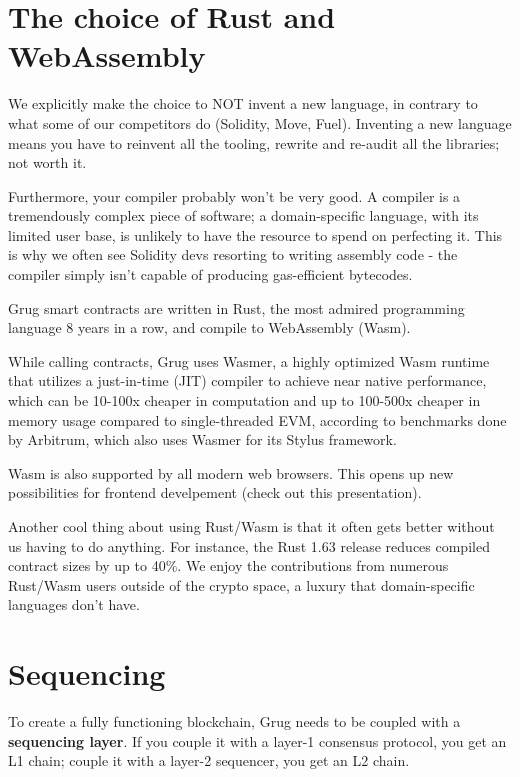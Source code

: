 \documentclass{article}
\begin{document}
\section{The choice of Rust and WebAssembly}

We explicitly make the choice to NOT invent a new language, in contrary to what some of our competitors do (Solidity, Move, Fuel). Inventing a new language means you have to reinvent all the tooling, rewrite and re-audit all the libraries; not worth it.

Furthermore, your compiler probably won't be very good. A compiler is a tremendously complex piece of software; a domain-specific language, with its limited user base, is unlikely to have the resource to spend on perfecting it. This is why we often see Solidity devs resorting to writing assembly code - the compiler simply isn't capable of producing gas-efficient bytecodes.

Grug smart contracts are written in Rust, the most admired programming language 8 years in a row,\supercite{mostadmiredlanguage2023} and compile to WebAssembly (Wasm).

While calling contracts, Grug uses Wasmer,\supercite{wasmer} a highly optimized Wasm runtime that utilizes a just-in-time (JIT) compiler to achieve near native performance,\supercite{wasmperformance} which can be 10-100x cheaper in computation and up to 100-500x cheaper in memory usage compared to single-threaded EVM, according to benchmarks\supercite{stylusgascosts} done by Arbitrum, which also uses Wasmer for its Stylus\supercite{stylus} framework.

Wasm is also supported by all modern web browsers. This opens up new possibilities for frontend develpement (check out this presentation\supercite{wasmcrossplatform}).

Another cool thing about using Rust/Wasm is that it often gets better without us having to do anything. For instance, the Rust 1.63 release reduces compiled contract sizes by up to 40\%.\supercite{wasmsizereduction} We enjoy the contributions from numerous Rust/Wasm users outside of the crypto space, a luxury that domain-specific languages don't have.

\section{Sequencing}

To create a fully functioning blockchain, Grug needs to be coupled with a \textbf{sequencing layer}. If you couple it with a layer-1 consensus protocol, you get an L1 chain; couple it with a layer-2 sequencer, you get an L2 chain.
\end{document}
